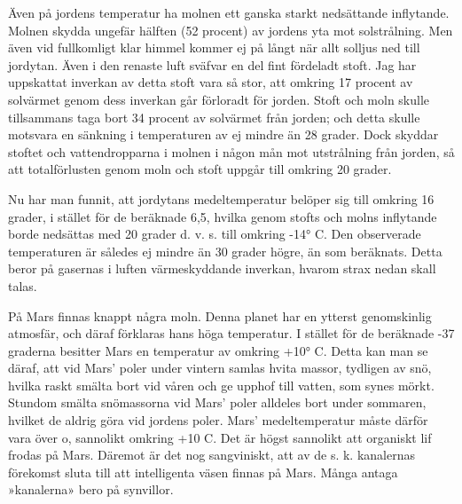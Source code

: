 \documentclass[a4paper, 12pt, oneside, swedish]{article}
\begin{document}
Även på jordens temperatur ha molnen ett ganska starkt nedsättande inflytande. Molnen skydda ungefär hälften (52 procent) av jordens yta mot solstrålning. Men även vid fullkomligt klar himmel kommer ej på långt när allt solljus ned till jordytan. Även i den renaste luft sväfvar en del fint fördeladt stoft. Jag har uppskattat inverkan av detta stoft vara så stor, att omkring 17 procent av solvärmet genom dess inverkan går förloradt för jorden. Stoft och moln skulle tillsammans taga bort 34 procent av solvärmet från jorden; och detta skulle motsvara en sänkning i temperaturen av ej mindre än 28 grader. Dock skyddar stoftet och vattendropparna i molnen i någon mån mot utstrålning från jorden, så att totalförlusten genom moln och stoft uppgår till omkring 20 grader.

Nu har man funnit, att jordytans medeltemperatur belöper sig till omkring 16 grader, i stället för de beräknade 6,5, hvilka genom stofts och molns inflytande borde nedsättas med 20 grader d. v. s. till omkring -14° C. Den observerade temperaturen är således ej mindre än 30 grader högre, än som beräknats. Detta beror på gasernas i luften värmeskyddande inverkan, hvarom strax nedan skall talas.

På Mars finnas knappt några moln. Denna planet har en ytterst genomskinlig atmosfär, och däraf förklaras hans höga temperatur. I stället för de beräknade -37 graderna besitter Mars en temperatur av omkring +10° C. Detta kan man se däraf, att vid Mars' poler under vintern samlas hvita massor, tydligen av snö, hvilka raskt smälta bort vid våren och ge upphof till vatten, som synes mörkt. Stundom smälta snömassorna vid Mars' poler alldeles bort under sommaren, hvilket de aldrig göra vid jordens poler. Mars' medeltemperatur måste därför vara över o, sannolikt omkring +10 C. Det är högst sannolikt att organiskt lif frodas på Mars. Däremot är det nog sangviniskt, att av de s. k. kanalernas förekomst sluta till att intelligenta väsen finnas på Mars. Många antaga »kanalerna» bero på synvillor.
\end{document}
